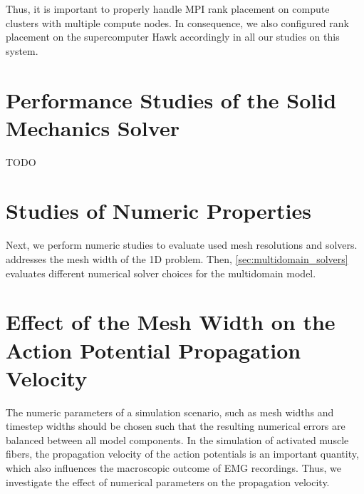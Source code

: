 Thus, it is important to properly handle MPI rank placement on compute clusters with multiple compute nodes. In consequence, we also configured rank placement on the supercomputer Hawk accordingly in all our studies on this system.

\section{Performance Studies of the Solid Mechanics Solver}

TODO

\section{Studies of Numeric Properties}

Next, we perform numeric studies to evaluate used mesh resolutions and solvers. 
 addresses the mesh width of the 1D problem. Then, \cref{sec:multidomain_solvers} evaluates different numerical solver choices for the multidomain model.

\section{Effect of the Mesh Width on the Action Potential Propagation Velocity}\label{sec:action_potential_velocity}

The numeric parameters of a simulation scenario, such as mesh widths and timestep widths should be chosen such that the resulting numerical errors are balanced between all model components. In the simulation of activated muscle fibers, the propagation velocity of the action potentials is an important quantity, which also influences the macroscopic outcome of EMG recordings. Thus, we investigate the effect of numerical parameters on the propagation velocity.

